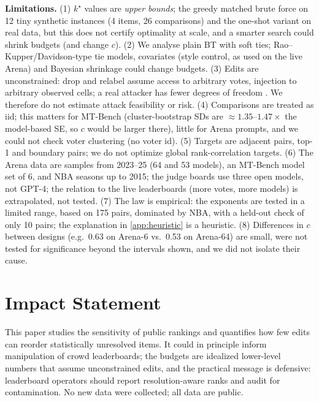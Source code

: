 \documentclass{article}
\theoremstyle{plain}
\theoremstyle{remark}
\newcommand{\kstar}{k^\star}
\begin{document}
\textbf{Limitations.} (1) $\kstar$ values are \emph{upper bounds}; the greedy matched brute force on 12 tiny synthetic instances (4 items, 26 comparisons) and the one-shot variant on real data, but this does not certify optimality at scale, and a smarter search could shrink budgets (and change $c$). (2) We analyse plain BT with soft ties; Rao--Kupper/Davidson-type tie models, covariates (style control, as used on the live Arena) and Bayesian shrinkage could change budgets. (3) Edits are unconstrained: drop and relabel assume access to arbitrary votes, injection to arbitrary observed cells; a real attacker has fewer degrees of freedom \citep{min2025}. We therefore do not estimate attack feasibility or risk. (4) Comparisons are treated as iid; this matters for MT-Bench (cluster-bootstrap SDs are $\approx1.35$--$1.47\times$ the model-based SE, so $c$ would be larger there), little for Arena prompts, and we could not check voter clustering (no voter id). (5) Targets are adjacent pairs, top-1 and boundary pairs; we do not optimize global rank-correlation targets. (6) The Arena data are samples from 2023--25 (64 and 53 models), an MT-Bench model set of 6, and NBA seasons up to 2015; the judge boards use three open models, not GPT-4; the relation to the live leaderboards (more votes, more models) is extrapolated, not tested. (7) The law is empirical: the exponents are tested in a limited range, based on 175 pairs, dominated by NBA, with a held-out check of only 10 pairs; the explanation in \cref{app:heuristic} is a heuristic. (8) Differences in $c$ between designs (e.g.\ 0.63 on Arena-6 vs.\ 0.53 on Arena-64) are small, were not tested for significance beyond the intervals shown, and we did not isolate their cause.

\section*{Impact Statement}
This paper studies the sensitivity of public rankings and quantifies how few edits can reorder statistically unresolved items. It could in principle inform manipulation of crowd leaderboards; the budgets are idealized lower-level numbers that assume unconstrained edits, and the practical message is defensive: leaderboard operators should report resolution-aware ranks and audit for contamination. No new data were collected; all data are public.




\newpage
\appendix
\onecolumn
\end{document}
